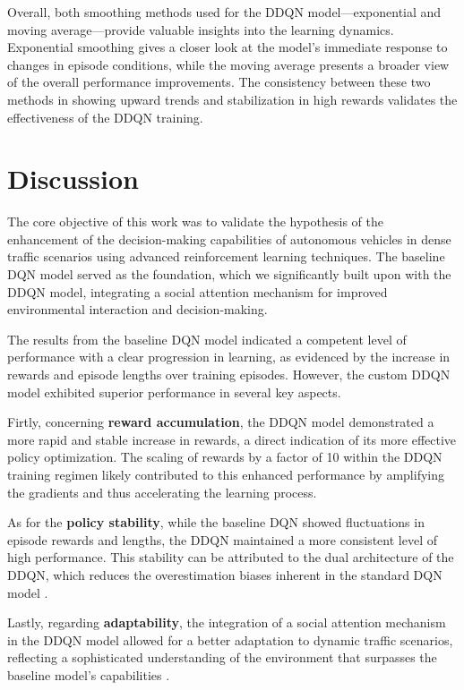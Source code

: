 \documentclass{article}
\begin{document}
Overall, both smoothing methods used for the DDQN model—exponential and moving average—provide valuable insights into the learning dynamics. Exponential smoothing gives a closer look at the model's immediate response to changes in episode conditions, while the moving average presents a broader view of the overall performance improvements. The consistency between these two methods in showing upward trends and stabilization in high rewards validates the effectiveness of the DDQN training.


\section{Discussion}

The core objective of this work was to validate the hypothesis of the enhancement of the decision-making capabilities of autonomous vehicles in dense traffic scenarios using advanced reinforcement learning techniques. The baseline DQN model served as the foundation, which we significantly built upon with the DDQN model, integrating a social attention mechanism for improved environmental interaction and decision-making.

The results from the baseline DQN model indicated a competent level of performance with a clear progression in learning, as evidenced by the increase in rewards and episode lengths over training episodes. However, the custom DDQN model exhibited superior performance in several key aspects.

Firtly, concerning \textbf{reward accumulation}, the DDQN model demonstrated a more rapid and stable increase in rewards, a direct indication of its more effective policy optimization. The scaling of rewards by a factor of 10 within the DDQN training regimen likely contributed to this enhanced performance by amplifying the gradients and thus accelerating the learning process.

As for the \textbf{policy stability}, while the baseline DQN showed fluctuations in episode rewards and lengths, the DDQN maintained a more consistent level of high performance. This stability can be attributed to the dual architecture of the DDQN, which reduces the overestimation biases inherent in the standard DQN model \citep{DBLP:journals/corr/HasseltGS15}.

Lastly, regarding \textbf{adaptability}, the integration of a social attention mechanism in the DDQN model allowed for a better adaptation to dynamic traffic scenarios, reflecting a sophisticated understanding of the environment that surpasses the baseline model's capabilities \citep{leurent2019social}.
\end{document}
